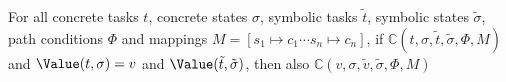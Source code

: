 \begin{lemma}
  \label{lem:valpres}
  For all concrete tasks $t$, concrete states $\sigma$, symbolic tasks $\tilde{t}$, symbolic states $\tilde{\sigma}$, path conditions $\Phi$ and mappings $M=[s_1\mapsto c_1\cdots s_n\mapsto c_n]$,
  if $\mathds{C}(t,\sigma,\tilde{t},\tilde{\sigma},\Phi,M)$ and $\Value(t,\sigma)=v$ and $\Value(\tilde{t},\tilde{\sigma})$,
  then also $\mathds{C}(v,\sigma,\tilde{v},\tilde{\sigma},\Phi,M)$
\end{lemma}
